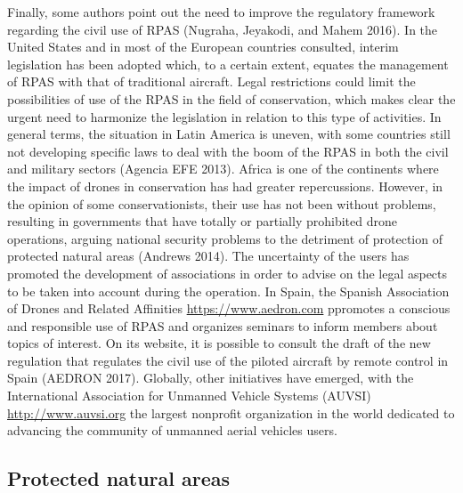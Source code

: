 \documentclass[]{interact}
\theoremstyle{plain}%
\theoremstyle{definition}
\theoremstyle{remark}
\begin{document}
Finally, some authors point out the need to improve the regulatory
framework regarding the civil use of RPAS (Nugraha, Jeyakodi, and Mahem
2016). In the United States and in most of the European countries
consulted, interim legislation has been adopted which, to a certain
extent, equates the management of RPAS with that of traditional
aircraft. Legal restrictions could limit the possibilities of use of the
RPAS in the field of conservation, which makes clear the urgent need to
harmonize the legislation in relation to this type of activities. In
general terms, the situation in Latin America is uneven, with some
countries still not developing specific laws to deal with the boom of
the RPAS in both the civil and military sectors (Agencia EFE 2013).
Africa is one of the continents where the impact of drones in
conservation has had greater repercussions. However, in the opinion of
some conservationists, their use has not been without problems,
resulting in governments that have totally or partially prohibited drone
operations, arguing national security problems to the detriment of
protection of protected natural areas (Andrews 2014). The uncertainty of
the users has promoted the development of associations in order to
advise on the legal aspects to be taken into account during the
operation. In Spain, the Spanish Association of Drones and Related
Affinities \url{https://www.aedron.com} ppromotes a conscious and
responsible use of RPAS and organizes seminars to inform members about
topics of interest. On its website, it is possible to consult the draft
of the new regulation that regulates the civil use of the piloted
aircraft by remote control in Spain (AEDRON 2017). Globally, other
initiatives have emerged, with the International Association for
Unmanned Vehicle Systems (AUVSI) \url{http://www.auvsi.org} the largest
nonprofit organization in the world dedicated to advancing the community
of unmanned aerial vehicles users.

\subsection{Protected natural areas}\label{protected-natural-areas}
\end{document}
